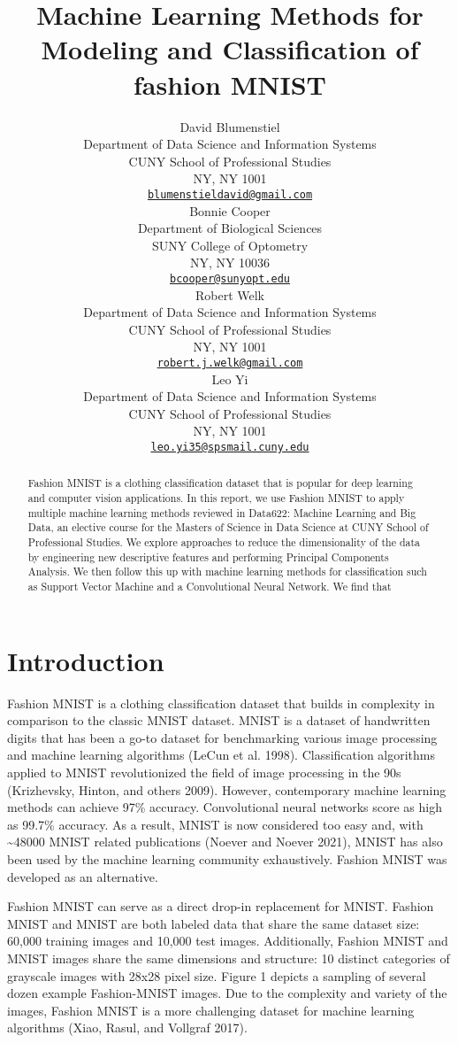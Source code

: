 \documentclass{article}
\title{Machine Learning Methods for Modeling and Classification of
fashion MNIST}
\author{
    David Blumenstiel
   \\
    Department of Data Science and Information Systems \\
    CUNY School of Professional Studies \\
  NY, NY 1001 \\
  \texttt{\href{mailto:blumenstieldavid@gmail.com}{\nolinkurl{blumenstieldavid@gmail.com}}} \\
   \And
    Bonnie Cooper
   \\
    Department of Biological Sciences \\
    SUNY College of Optometry \\
  NY, NY 10036 \\
  \texttt{\href{mailto:bcooper@sunyopt.edu}{\nolinkurl{bcooper@sunyopt.edu}}} \\
   \And
    Robert Welk
   \\
    Department of Data Science and Information Systems \\
    CUNY School of Professional Studies \\
  NY, NY 1001 \\
  \texttt{\href{mailto:robert.j.welk@gmail.com}{\nolinkurl{robert.j.welk@gmail.com}}} \\
   \And
    Leo Yi
   \\
    Department of Data Science and Information Systems \\
    CUNY School of Professional Studies \\
  NY, NY 1001 \\
  \texttt{\href{mailto:leo.yi35@spsmail.cuny.edu}{\nolinkurl{leo.yi35@spsmail.cuny.edu}}} \\
  }
\begin{document}
\maketitle

\def\tightlist{}


\begin{abstract}
Fashion MNIST is a clothing classification dataset that is popular for
deep learning and computer vision applications. In this report, we use
Fashion MNIST to apply multiple machine learning methods reviewed in
Data622: Machine Learning and Big Data, an elective course for the
Masters of Science in Data Science at CUNY School of Professional
Studies. We explore approaches to reduce the dimensionality of the data
by engineering new descriptive features and performing Principal
Components Analysis. We then follow this up with machine learning
methods for classification such as Support Vector Machine and a
Convolutional Neural Network. We find that
\end{abstract}


\hypertarget{introduction}{%
\section{Introduction}\label{introduction}}

Fashion MNIST is a clothing classification dataset that builds in
complexity in comparison to the classic MNIST dataset. MNIST is a
dataset of handwritten digits that has been a go-to dataset for
benchmarking various image processing and machine learning algorithms
(LeCun et al. 1998). Classification algorithms applied to MNIST
revolutionized the field of image processing in the 90s (Krizhevsky,
Hinton, and others 2009). However, contemporary machine learning methods
can achieve 97\% accuracy. Convolutional neural networks score as high
as 99.7\% accuracy. As a result, MNIST is now considered too easy and,
with \textasciitilde48000 MNIST related publications (Noever and Noever
2021), MNIST has also been used by the machine learning community
exhaustively. Fashion MNIST was developed as an alternative.

Fashion MNIST can serve as a direct drop-in replacement for MNIST.
Fashion MNIST and MNIST are both labeled data that share the same
dataset size: 60,000 training images and 10,000 test images.
Additionally, Fashion MNIST and MNIST images share the same dimensions
and structure: 10 distinct categories of grayscale images with 28x28
pixel size. Figure 1 depicts a sampling of several dozen example
Fashion-MNIST images. Due to the complexity and variety of the images,
Fashion MNIST is a more challenging dataset for machine learning
algorithms (Xiao, Rasul, and Vollgraf 2017).
\end{document}
